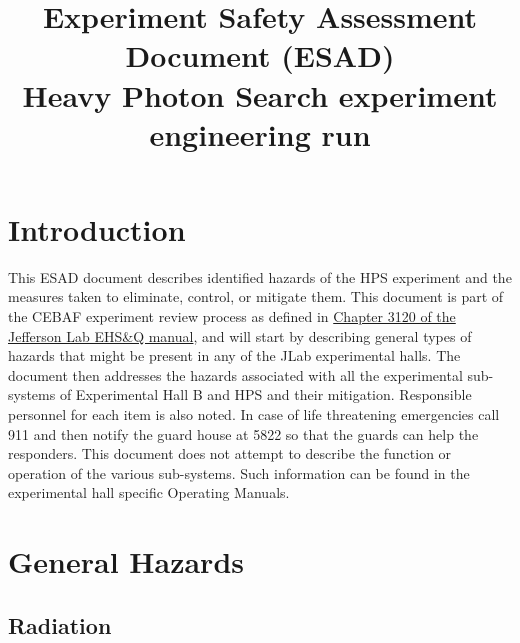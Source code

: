 \documentclass[11pt]{report}
\begin{document}
\title{ Experiment Safety Assessment Document (ESAD) \\ 
Heavy Photon Search experiment engineering run}
%
%
%
\maketitle
\tableofcontents

\chapter{Introduction}

This ESAD document describes identified hazards of the HPS experiment and the measures taken to eliminate, control, or mitigate them.
This document is part of the CEBAF experiment review process as defined in
\href{http://www.jlab.org/ehs/ehsmanual/manual/3120.html}{Chapter 3120 of the Jefferson Lab EHS\&Q manual},
and will start by describing general types of hazards that might be present in any of the  
JLab experimental halls.  The document then addresses the hazards associated 
with all the experimental sub-systems of Experimental Hall B and HPS and their 
mitigation.  Responsible personnel for each item is also noted.  
In case of life threatening 
emergencies call 911 and then notify the guard house at 5822 so that the guards can help
the responders.  This document does not attempt to describe the function 
or operation of the various sub-systems. Such information can be found in
the experimental hall specific Operating Manuals.


\chapter{General Hazards}

\section{Radiation}
	
\end{document}
